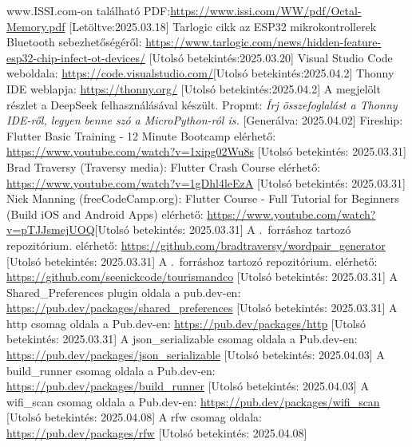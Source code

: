 \documentclass{thesis-ekf}
\theoremstyle{definition}
\theoremstyle{remark}
\begin{document}
\begin{thebibliography}{8}
	 www.ISSI.com-on található PDF:\url{https://www.issi.com/WW/pdf/Octal-Memory.pdf}
	 [Letöltve:2025.03.18]
	 Tarlogic cikk az ESP32 mikrokontrollerek Bluetooth sebezhetőségéről: \url{https://www.tarlogic.com/news/hidden-feature-esp32-chip-infect-ot-devices/}
	[Utolsó betekintés:2025.03.20]
	 Visual Studio Code weboldala: \url{https://code.visualstudio.com/}[Utolsó betekintés:2025.04.2]
	 Thonny IDE weblapja: \url{https://thonny.org/}
	[Utolsó betekintés:2025.04.2]
	 A megjelölt részlet a DeepSeek felhasználásával készült. Propmt: \textit{Írj összefoglalást a Thonny IDE-ről, legyen benne szó a MicroPython-ról is.}
	[Generálva: 2025.04.02]
	 Fireship: Flutter Basic Training - 12 Minute Bootcamp elérhető: \url{https://www.youtube.com/watch?v=1xipg02Wu8s}
	[Utolsó betekintés: 2025.03.31]
	 Brad Traversy (Traversy media): Flutter Crash Course elérhető: \url{https://www.youtube.com/watch?v=1gDhl4leEzA}
	[Utolsó betekintés: 2025.03.31]
	 Nick Manning (freeCodeCamp.org): Flutter Course - Full Tutorial for Beginners (Build iOS and Android Apps) elérhető: \url{https://www.youtube.com/watch?v=pTJJsmejUOQ}[Utolsó betekintés: 2025.03.31]
	 A \cite{bib_flutter_traversy}.~forráshoz tartozó repozitórium. elérhető: \url{https://github.com/bradtraversy/wordpair_generator}
	[Utolsó betekintés: 2025.03.31]
	 A \cite{bib_flutter_freecodecamp}.~forráshoz tartozó repozitórium. elérhető: \url{https://github.com/seenickcode/tourismandco}
	[Utolsó betekintés: 2025.03.31]
	 A Shared\_Preferences plugin oldala a pub.dev-en: \url{https://pub.dev/packages/shared_preferences}
	[Utolsó betekintés: 2025.03.31]
	 A http csomag oldala a Pub.dev-en: \url{https://pub.dev/packages/http}
	[Utolsó betekintés: 2025.03.31]
	 A json\_serializable csomag oldala a Pub.dev-en: \url{https://pub.dev/packages/json_serializable}
	[Utolsó betekintés: 2025.04.03]
	 A build\_runner csomag oldala a Pub.dev-en: \url{https://pub.dev/packages/build_runner}
	[Utolsó betekintés: 2025.04.03]
	 A wifi\_scan csomag oldala a Pub.dev-en: \url{https://pub.dev/packages/wifi_scan}
	[Utolsó betekintés: 2025.04.08]
	 A rfw csomag oldala: \url{https://pub.dev/packages/rfw}
	[Utolsó betekintés: 2025.04.08]
\end{thebibliography}

\end{document}
